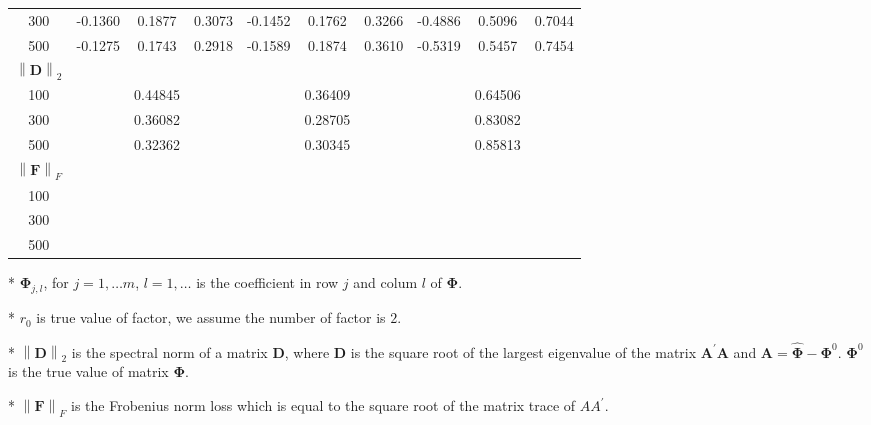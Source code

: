 \documentclass[12pt,a4paper,hyperref]{article}
\begin{document}
\begin{table}[H]
\begin{threeparttable}
\begin{tabular} {*{10}{c}}
300&-0.1360 &0.1877  &0.3073 &-0.1452	  &0.1762	&0.3266	&-0.4886 &0.5096 &0.7044  \\
500& -0.1275& 0.1743 &0.2918   &	-0.1589 &0.1874	&0.3610 &-0.5319&0.5457 &	0.7454  \\
\cmidrule(lr){1-10}
$\left\| \boldsymbol{D} \right\|_{2} $\\
\cmidrule(lr){1-4}   \cmidrule(lr){5-7}   \cmidrule(lr){8-10}
100&  &0.44845 & &	  &	0.36409& & &0.64506 &   \\
300&  & 0.36082& &	  &0.28705	&	& &0.83082&  \\
500& & 0.32362&   &	  &0.30345	& & & 0.85813&	  \\
\cmidrule(lr){1-10}
$\left\| \boldsymbol{F} \right\|_{F} $\\
\cmidrule(lr){1-4}   \cmidrule(lr){5-7}   \cmidrule(lr){8-10}
100&  & & &	  &	& & & &   \\
300&   &  & &	  &	&	& & &  \\
500& &  &   &	  &	& & & &	  \\
\bottomrule
\end{tabular}
\begin{tablenotes}
\footnotesize
  \item[*] $\boldsymbol{\Phi}_{j,l}$, for $j=1,\ldots m$, $l=1,\ldots$ is the coefficient in row $j$ and colum $l$ of $\boldsymbol{\Phi}$.
\item[*] $r_{0}$ is true value of factor, we assume the number of factor is $2$.
 \item[*] $\left\| \boldsymbol{D} \right\|_{2}$ is the spectral norm of a matrix $\boldsymbol{D}$, where $\boldsymbol{D}$ is the square root of the largest eigenvalue of the matrix $\boldsymbol{A}^{'}\boldsymbol{A}$ and $\boldsymbol{A}=\hat{\boldsymbol{\Phi}}- \boldsymbol{\Phi}^{0}$. $\boldsymbol{\Phi}^{0}$ is the true value of matrix $\boldsymbol{\Phi}$.
 \item[*] $\left\| \boldsymbol{F} \right\|_{F} $ is the Frobenius norm loss which is equal to the square root of the matrix trace of $AA^{'}$.
    \end{tablenotes}
\end{threeparttable}
\end{table}
\end{document}
